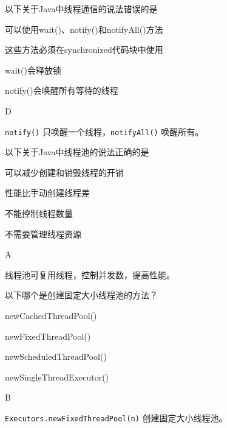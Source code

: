 \begin{question}
	以下关于Java中线程通信的说法错误的是
	\begin{options}
		\item 可以使用wait()、notify()和notifyAll()方法
		\item 这些方法必须在synchronized代码块中使用
		\item wait()会释放锁
		\item notify()会唤醒所有等待的线程
	\end{options}
	\begin{answer}
		D
	\end{answer}
	\begin{explanation}
		\texttt{notify()} 只唤醒一个线程，\texttt{notifyAll()} 唤醒所有。
	\end{explanation}
\end{question}

\begin{question}
	以下关于Java中线程池的说法正确的是
	\begin{options}
		\item 可以减少创建和销毁线程的开销
		\item 性能比手动创建线程差
		\item 不能控制线程数量
		\item 不需要管理线程资源
	\end{options}
	\begin{answer}
		A
	\end{answer}
	\begin{explanation}
		线程池可复用线程，控制并发数，提高性能。
	\end{explanation}
\end{question}

\begin{question}
	以下哪个是创建固定大小线程池的方法？
	\begin{options}
		\item newCachedThreadPool()
		\item newFixedThreadPool()
		\item newScheduledThreadPool()
		\item newSingleThreadExecutor()
	\end{options}
	\begin{answer}
		B
	\end{answer}
	\begin{explanation}
		\texttt{Executors.newFixedThreadPool(n)} 创建固定大小线程池。
	\end{explanation}
\end{question}

